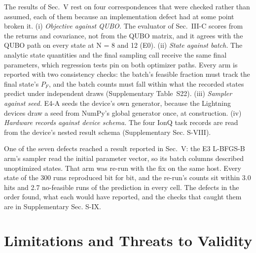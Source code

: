 \documentclass[journal]{IEEEtran}
\begin{document}
The results of Sec.~V rest on four correspondences that were checked rather than assumed, each of them because an implementation defect had at some point broken it. (i) \textit{Objective against QUBO.} The evaluator of Sec.~III-C scores from the returns and covariance, not from the QUBO matrix, and it agrees with the QUBO path on every state at N = 8 and 12 (E0). (ii) \textit{State against batch.} The analytic state quantities and the final sampling call receive the same final parameters, which regression tests pin on both optimizer paths. Every arm is reported with two consistency checks: the batch's feasible fraction must track the final state's $P_{F}$, and the batch counts must fall within what the recorded states predict under independent draws (Supplementary Table~S22). (iii) \textit{Sampler against seed.} E4-A seeds the device's own generator, because the Lightning devices draw a seed from NumPy's global generator once, at construction. (iv) \textit{Hardware records against device schema.} The four IonQ task records are read from the device's nested result schema (Supplementary Sec. S-VIII).


One of the seven defects reached a result reported in Sec.~V: the E3 L-BFGS-B arm's sampler read the initial parameter vector, so its batch columns described unoptimized states. That arm was re-run with the fix on the same host. Every state of the 300 runs reproduced bit for bit, and the re-run's counts sit within 3.0 hits and 2.7 no-feasible runs of the prediction in every cell. The defects in the order found, what each would have reported, and the checks that caught them are in Supplementary Sec. S-IX.


\section{Limitations and Threats to Validity}
\end{document}
